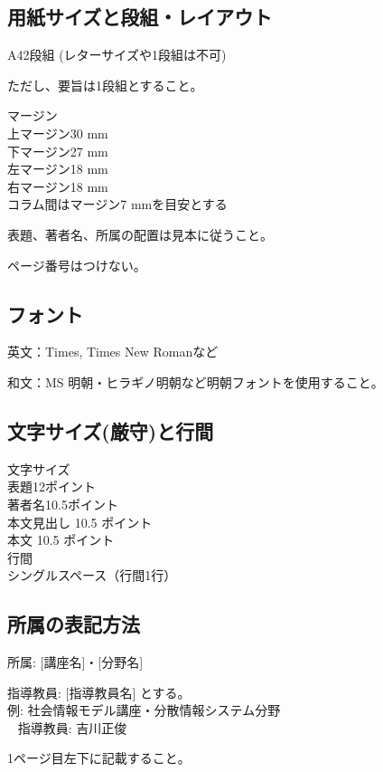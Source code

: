 \documentclass[fontsize=10.5bp]{jlreq}
\begin{document}
\subsection{用紙サイズと段組・レイアウト}
A42段組 (レターサイズや1段組は不可)

\qquad \qquad ただし、要旨は1段組とすること。

マージン\\
\qquad \qquad 上マージン30 mm\\
\qquad \qquad 下マージン27 mm\\
\qquad \qquad 左マージン18 mm\\
\qquad \qquad 右マージン18 mm\\
\qquad \qquad コラム間はマージン7 mmを目安とする

表題、著者名、所属の配置は見本に従うこと。

ページ番号はつけない。

\subsection{フォント}
英文：Times, Times New Romanなど

和文：MS 明朝・ヒラギノ明朝など明朝フォントを使用すること。

\subsection{文字サイズ(厳守)と行間}
文字サイズ\\
\qquad \qquad 表題12ポイント\\
\qquad \qquad 著者名10.5ポイント\\
\qquad \qquad 本文見出し 10.5 ポイント\\
\qquad \qquad 本文 10.5 ポイント\\

行間\\
\qquad \qquad シングルスペース（行間1行）

\subsection{所属の表記方法}
所属: [講座名]・[分野名] 

指導教員: [指導教員名] \qquad とする。\\

例: 社会情報モデル講座・分散情報システム分野\\
\qquad ~ 指導教員: 吉川正俊

1ページ目左下に記載すること。
\end{document}
